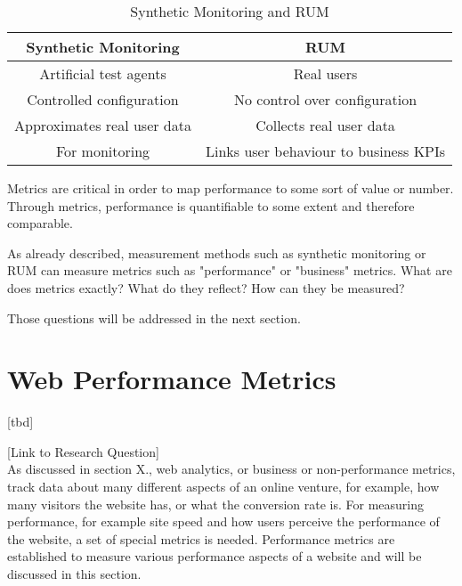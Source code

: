 \begin{table}[h!]
\begin{center}
\begin{tabular}{  c | c  }
Synthetic Monitoring & RUM \\
\hline
\hline
Artificial test agents & Real users \\
\hline
Controlled configuration & No control over configuration \\
\hline
Approximates real user data & Collects real user data \\
\hline
For monitoring & Links user behaviour to business KPIs \\
\end{tabular}
\caption{Synthetic Monitoring and RUM}
\end{center}
\end{table}



Metrics are critical in order to map performance to some sort of value or number.
Through metrics, performance is quantifiable to some extent and therefore comparable.

As already described, measurement methods such as synthetic monitoring or RUM can measure metrics such as "performance" or "business" metrics.
What are does metrics exactly?
What do they reflect?
How can they be measured?

Those questions will be addressed in the next section.








\section{Web Performance Metrics}

[tbd]

[Link to Research Question] \\




As discussed in section X., web analytics, or business or non-performance metrics, track data about many different aspects of an online venture, for example, how many visitors the website has, or what the conversion rate is.
For measuring performance, for example site speed and how users perceive the performance of the website, a set of special metrics is needed.
Performance metrics are established to measure various performance aspects of a website and will be discussed in this section.


